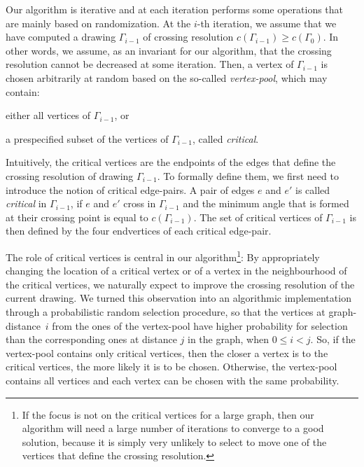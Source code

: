 \documentclass[runningheads]{llncs}
\begin{document}
Our algorithm is iterative and at each iteration performs some operations that are mainly based on randomization. At the $i$-th iteration, we assume that we have computed a drawing $\Gamma_{i-1}$ of crossing resolution $c(\Gamma_{i-1}) \geq c(\Gamma_0)$.
In other words, we assume, as an invariant for our algorithm, that the crossing resolution cannot be decreased at some iteration. Then, a vertex of $\Gamma_{i-1}$ is chosen arbitrarily at random based on the so-called \emph{vertex-pool}, which may contain:
%
\begin{inparaenum}[(i)]
\item either all vertices of $\Gamma_{i-1}$, or
\item a prespecified subset of the vertices of $\Gamma_{i-1}$, called \emph{critical}.
\end{inparaenum}

Intuitively, the critical vertices are the endpoints of the edges that define the crossing resolution of drawing $\Gamma_{i-1}$. To formally define them, we first need to introduce the notion of critical edge-pairs. A pair of edges $e$ and $e'$ is called \emph{critical} in $\Gamma_{i-1}$, if $e$ and $e'$ cross in $\Gamma_{i-1}$ and the minimum angle that is formed at their crossing point is equal to $c(\Gamma_{i-1})$. The set of critical vertices of $\Gamma_{i-1}$ is then defined by the four endvertices of each critical edge-pair.

The role of critical vertices is central in our algorithm\footnote{If the focus is not on the critical vertices for a large graph, then our algorithm will need a large number of iterations to converge to a good solution, because it is simply very unlikely to select to move one of the vertices that define the crossing resolution.}: By appropriately changing the location of a critical vertex or of a vertex in the neighbourhood of the critical vertices, we naturally expect to improve the crossing resolution of the current drawing. We turned this observation into an algorithmic implementation through a probabilistic random selection procedure, so that the vertices at graph-distance~$i$ from the ones of the vertex-pool have higher probability for selection than the corresponding ones at distance $j$  in the graph, when $0 \leq i<j$. So, if the vertex-pool contains only critical vertices, then the closer a vertex is to the critical vertices, the more likely it is to be chosen. Otherwise, the vertex-pool contains all vertices and each vertex can be chosen with the same probability.
\end{document}

